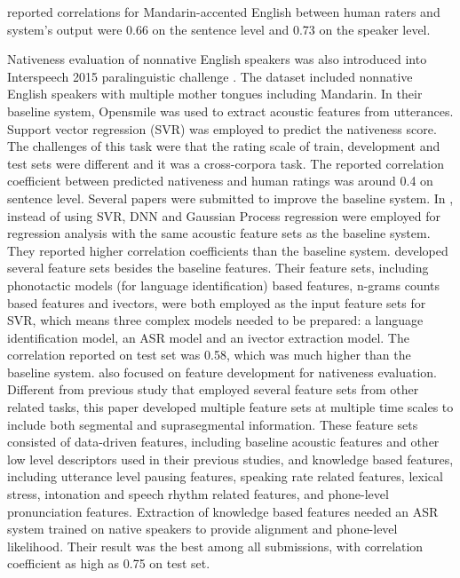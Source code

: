 reported correlations for Mandarin-accented English between human raters and system's output were 0.66 on the sentence level and 0.73 on the speaker level.

Nativeness evaluation of nonnative English speakers was also introduced into Interspeech 2015 paralinguistic challenge \citep{schuller2015interspeech}. The dataset included nonnative English speakers with multiple mother tongues including Mandarin. In their baseline system, Opensmile \cite{eyben2010opensmile} was used to extract acoustic features from utterances. Support vector regression (SVR) was employed to predict the nativeness score. The challenges of this task were that the rating scale of train, development and test sets were different and it was a cross-corpora task. The reported correlation coefficient between predicted nativeness and human ratings was around 0.4 on sentence level. Several papers were submitted to improve the baseline system. In \citep{grosz2015assessing}, instead of using SVR, DNN and Gaussian Process regression were employed for regression analysis with the same acoustic feature sets as the baseline system. They reported higher correlation coefficients than the baseline system. \cite{ribeiro2015combining} developed several feature sets besides the baseline features. Their feature sets, including phonotactic models (for language identification) based features, n-grams counts based features and ivectors, were both employed as the input feature sets for SVR, which means three complex models needed to be prepared: a language identification model, an ASR model and an ivector extraction model. The correlation reported on test set was 0.58, which was much higher than the baseline system. \cite{black2015automated} also focused on feature development for nativeness evaluation. Different from previous study that employed several feature sets from other related tasks, this paper developed multiple feature sets at multiple time scales to include both segmental and suprasegmental information. These feature sets consisted of data-driven features, including baseline acoustic features and other low level descriptors used in their previous studies, and knowledge based features, including utterance level pausing features, speaking rate related features, lexical stress, intonation and speech rhythm related features, and phone-level pronunciation features. Extraction of knowledge based features needed an ASR system trained on native speakers to provide alignment and phone-level likelihood. Their result was the best among all submissions, with correlation coefficient as high as 0.75 on test set.

